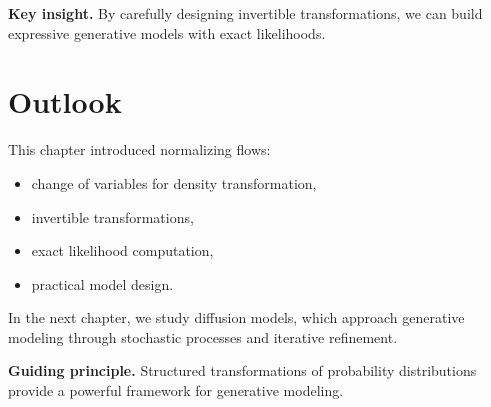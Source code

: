 \medskip

\noindent
\textbf{Key insight.}  
By carefully designing invertible transformations, we can build expressive generative models with exact likelihoods.

\section{Outlook}

This chapter introduced normalizing flows:
\begin{itemize}
    \item change of variables for density transformation,
    \item invertible transformations,
    \item exact likelihood computation,
    \item practical model design.
\end{itemize}

\medskip

In the next chapter, we study diffusion models, which approach generative modeling through stochastic processes and iterative refinement.

\medskip

\noindent
\textbf{Guiding principle.}  
Structured transformations of probability distributions provide a powerful framework for generative modeling.
